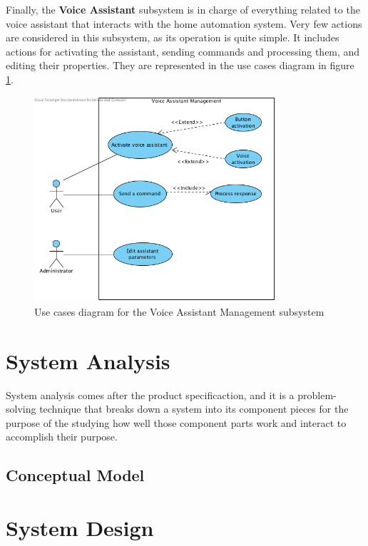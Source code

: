 Finally, the \textbf{Voice Assistant} subsystem is in charge of everything related to the voice assistant that interacts with the
home automation system. Very few actions are considered in this subsystem, as its operation is quite simple. It includes actions 
for activating the assistant, sending commands and processing them, and editing their properties. They are represented in the
use cases diagram in figure \ref{fig:UC-voice-assistant-management}.

\begin{figure}
	\centering
	\includegraphics[width=0.8\textwidth]{images/Chapter_06/UC-voice-assistant-management.png}
	\caption{Use cases diagram for the Voice Assistant Management subsystem}
	\label{fig:UC-voice-assistant-management}
\end{figure}

\bigskip
\section{System Analysis}
System analysis comes after the product specificaction, and it is a problem-solving technique that breaks down a system into its 
component pieces for the purpose of the studying how well those component parts work and interact to accomplish their 
purpose.\cite{bentleySystemAnalysis}

\subsection{Conceptual Model}

\bigskip
\section{System Design}

